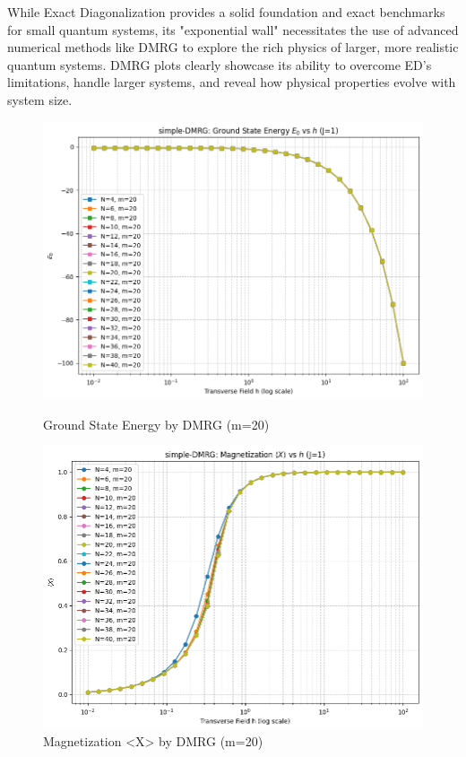 \documentclass[a4paper]{article}
\begin{document}
While Exact Diagonalization provides a solid foundation and exact benchmarks for small quantum systems, its "exponential wall" necessitates the use of advanced numerical methods like DMRG to explore the rich physics of larger, more realistic quantum systems. DMRG plots clearly showcase its ability to overcome ED's limitations, handle larger systems, and reveal how physical properties evolve with system size.
\begin{figure}[htbp]
    \centering
    \begin{minipage}{0.48\textwidth}
        \centering
        \includegraphics[width=\linewidth]{images/E_DMRG.png} %
        \caption{Ground State Energy by DMRG (m=20)}
        \label{dmrg_a}
    \end{minipage}\hfill %
    \begin{minipage}{0.48\textwidth}
        \centering
        \includegraphics[width=\linewidth]{images/mx_DMRG.png} %
        \caption{Magnetization <X> by DMRG (m=20)}
        \label{dmrg_b}
    \end{minipage}
\end{figure}
\end{document}
